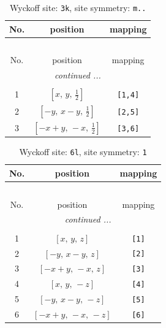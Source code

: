 \documentclass[fleqn,8pt]{jsarticle}
\begin{document}
\begin{longtable}{ccc}
\caption{Wyckoff site: {\tt 3k}, site symmetry: {\tt m..}}
 \\
 \hline \hline
No. & position & mapping \\ \hline \endfirsthead

\multicolumn{2}{l}{\tablename\ \thetable{}} \\
 \hline \hline
No. & position & mapping \\ \hline \endhead

 \hline \hline
\multicolumn{2}{r}{\footnotesize\it continued ...} \\ \endfoot

 \hline \hline
\multicolumn{2}{r}{} \\ \endlastfoot

1 & $\left[ x,\, y,\, \frac{1}{2} \right]$ & {\tt [1,4]} \\ \hline
2 & $\left[ - y,\, x - y,\, \frac{1}{2} \right]$ & {\tt [2,5]} \\ \hline
3 & $\left[ - x + y,\, - x,\, \frac{1}{2} \right]$ & {\tt [3,6]} \\
\end{longtable}
\renewcommand{\arraystretch}{1.2}
\begin{longtable}{ccc}
\caption{Wyckoff site: {\tt 6l}, site symmetry: {\tt 1}}
 \\
 \hline \hline
No. & position & mapping \\ \hline \endfirsthead

\multicolumn{2}{l}{\tablename\ \thetable{}} \\
 \hline \hline
No. & position & mapping \\ \hline \endhead

 \hline \hline
\multicolumn{2}{r}{\footnotesize\it continued ...} \\ \endfoot

 \hline \hline
\multicolumn{2}{r}{} \\ \endlastfoot

1 & $\left[ x,\, y,\, z \right]$ & {\tt [1]} \\ \hline
2 & $\left[ - y,\, x - y,\, z \right]$ & {\tt [2]} \\ \hline
3 & $\left[ - x + y,\, - x,\, z \right]$ & {\tt [3]} \\ \hline
4 & $\left[ x,\, y,\, - z \right]$ & {\tt [4]} \\ \hline
5 & $\left[ - y,\, x - y,\, - z \right]$ & {\tt [5]} \\ \hline
6 & $\left[ - x + y,\, - x,\, - z \right]$ & {\tt [6]} \\
\end{longtable}
\end{document}
